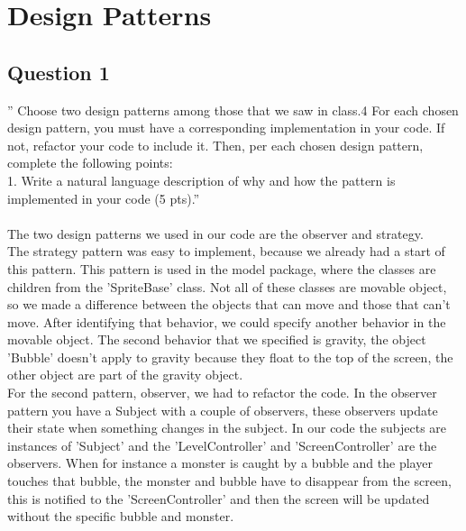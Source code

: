 \chapter{Design Patterns}
\section{Question 1}

'' Choose two design patterns among those that we saw in class.4 For each chosen design pattern, you must
have a corresponding implementation in your code. If not, refactor your code to include it. Then, per each
chosen design pattern, complete the following points:\\
1. Write a natural language description of why and how the pattern is implemented in your code (5 pts).''
\\
\\
The two design patterns we used in our code are the observer and strategy.\\ The strategy pattern was easy to implement, because we already had a start of this pattern. This pattern is used in the model package, where the classes are children from the 'SpriteBase' class. Not all of these classes are movable object, so we made a difference between the objects that can move and those that can't move. After identifying that behavior, we could specify another behavior in the movable object. The second behavior that we specified is gravity, the object 'Bubble' doesn't apply to gravity because they float to the top of the screen, the other object are part of the gravity object.\\
For the second pattern, observer, we had to refactor the code. In the observer pattern you have a Subject with a couple of observers, these observers update their state when something changes in the subject. In our code the subjects are instances of 'Subject' and the 'LevelController' and 'ScreenController' are the observers. When for instance a monster is caught by a bubble and the player touches that bubble, the monster and bubble have to disappear from the screen, this is notified to the 'ScreenController' and then the screen will be updated without the specific bubble and monster.